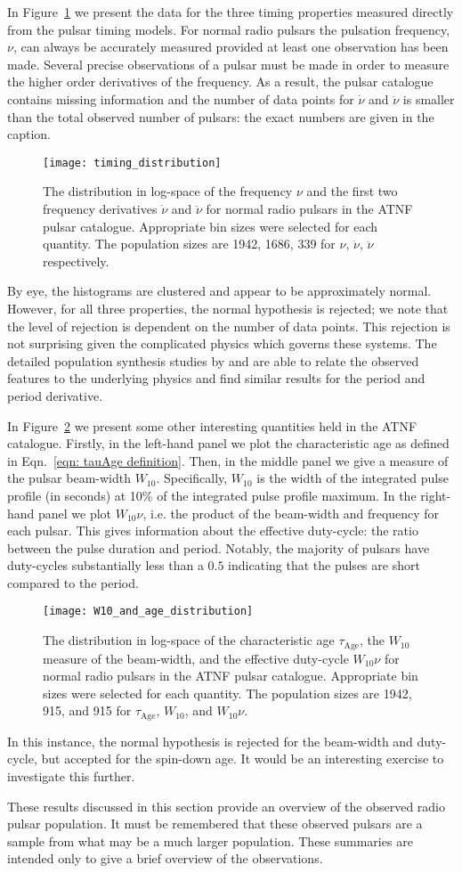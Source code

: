 In Figure~\ref{fig: pop stats timing} we present the data for the three timing
properties measured directly from the pulsar timing models. For normal radio
pulsars the pulsation frequency, $\nu$, can always be accurately measured
provided at least
one observation has been made.  Several precise observations of a pulsar must
be made in order to measure the higher order derivatives of the frequency. As a
result, the pulsar catalogue contains missing information and the number of
data points for $\dot{\nu}$ and $\ddot{\nu}$ is smaller than the total observed
number of pulsars: the exact numbers are given in the caption.
\begin{figure}[htb]
\centering
\texttt{[image: timing\_distribution]}
\caption{The distribution in log-space of the frequency $\nu$ and the first two
frequency derivatives $\dot{\nu}$ and $\ddot{\nu}$ for normal radio pulsars in the
ATNF pulsar catalogue. Appropriate bin sizes were selected for each quantity.
The population sizes are 1942, 1686, 339 for $\nu$,
$\dot{\nu}$, $\ddot{\nu}$ respectively.}
\label{fig: pop stats timing}
\end{figure}
By eye, the histograms are clustered and appear to be approximately normal.
However, for all three properties, the normal hypothesis is rejected; we note
that the level of rejection is dependent on the number of data points. This
rejection is not surprising given the complicated physics which governs these
systems. The detailed population synthesis studies by \citet{faucher2006birth}
and \citet{popov2010population} are able to relate the observed features to the
underlying physics and find similar results for the period and period
derivative.

In Figure~\ref{fig: pop stats others} we present some other interesting quantities
held in the ATNF catalogue. Firstly, in the left-hand panel we plot the characteristic
age as defined in Eqn.~\eqref{eqn: tauAge definition}. Then, in the middle panel
we give a measure of the pulsar beam-width $W_{10}$. Specifically, $W_{10}$ is
the width of the integrated pulse profile (in seconds) at 10\% of the integrated
pulse profile maximum. In the right-hand panel we  plot $W_{10}\nu$, i.e. the
product of the beam-width and frequency for each pulsar. This gives information
about the effective duty-cycle: the ratio between the pulse duration and period.
Notably, the majority of pulsars have duty-cycles substantially less than a
$0.5$ indicating that the pulses are short compared to the period.
\begin{figure}[htb]
\centering
\texttt{[image: W10\_and\_age\_distribution]}
\caption{The distribution in log-space of the characteristic age
$\tau_{\textrm{Age}}$, the $W_{10}$ measure of the beam-width, and the
effective duty-cycle $W_{10} \nu$ for normal radio pulsars in the
ATNF pulsar catalogue. Appropriate bin sizes were selected for each quantity.
The population sizes are 1942, 915, and 915 for
$\tau_{\textrm{Age}}$, $W_{10}$, and $W_{10}\nu$.}
\label{fig: pop stats others}
\end{figure}
In this instance, the normal hypothesis is rejected for the beam-width and
duty-cycle, but accepted for the spin-down age. It would be an interesting
exercise to investigate this further.

These results discussed in this section provide an overview of the observed
radio pulsar population. It must be remembered that these observed pulsars
are a sample from what may be a much larger population. These summaries are
intended only to give a brief overview of the observations.

